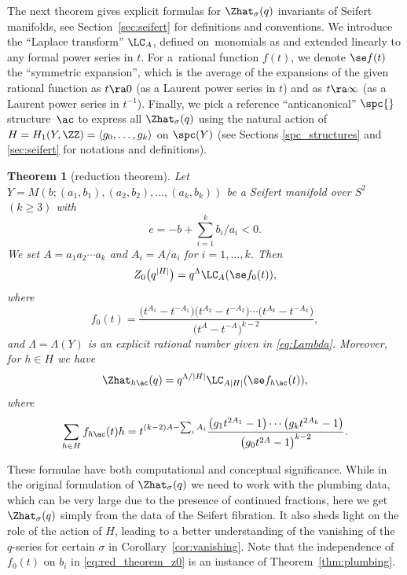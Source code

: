 \documentclass[pdftex]{sigma}
\newtheorem{Theorem}{Theorem}[section]
\begin{document}
The next theorem gives explicit formulas for $\Zhat_\sigma(q)$ invariants of Seifert manifolds, see Section~\ref{sec:seifert} for definitions and conventions. We introduce the ``Laplace transform'' $\LC_A$, defined on~monomials as
and extended linearly to any formal power series in $t$. For a~rational function $f(t)$, we denote $\se f(t)$ the ``symmetric expansion'', which is the average of the expansions of the given rational function as $t \ra 0$ (as a Laurent power series in $t$) and as $t \ra \infty$ \big(as a Laurent power series in $t^{-1}$\big). Finally, we pick a reference ``anticanonical'' $\spc{}$ structure~$\ac$ to express all $\Zhat_\sigma(q)$ using the natural action of $H = H_1(Y,\ZZ) = \langle g_0,\dots, g_k \rangle$ on $\spc(Y)$ (see Sections \ref{spc_structures} and \ref{sec:seifert} for notations and definitions).

\begin{Theorem}[reduction theorem]
	Let $Y = M(b;(a_1, b_1), (a_2, b_2), \dots, (a_k, b_k))$ be a Seifert manifold over $S^2$ $(k \geq 3)$ with
\[
e=-b+\sum_{i=1}^k b_i/a_i<0.
\]
 We set $A=a_1 a_2\cdots a_k$ and $A_i=A/a_i$ for $i=1,\dots, k$. Then
	\begin{gather}\label{eq:red_theorem_z0}
		Z_0\bigl(q^{|H|}\bigr) = q^\Lambda \LC_A(\se f_0(t)),
	\end{gather}
	where
	\[
		f_0(t) = \frac{\bigl(t^{A_1}-t^{-A_1}\bigr)\bigl(t^{A_2}-t^{-A_2}\bigr)\cdots\bigl(t^{A_k}-t^{-A_k}\bigr)}{\bigl(t^A-t^{-A}\bigr)^{k-2}},
	\]
 and $\Lambda = \Lambda(Y)$ is an explicit rational number given in \eqref{eq:Lambda}.
	Moreover, for $h \in H$ we have
	\[
		\Zhat_{h \ac}(q) = q^{\Lambda/|H|} \LC_{A|H|}(\se f_{h \ac}(t)),
	\]
	where
	\[
		\sum_{h \in H} f_{h \ac}(t)h = t^{(k-2)A - \sum_i A_i}\frac{\bigl(g_1 t^{2A_1}-1\bigr)\cdots\bigl(g_k t^{2A_k}-1\bigr)}{\bigl(g_0 t^{2A}-1\bigr)^{k-2}}.
	\]
\end{Theorem}

These formulae have both computational and conceptual significance. While in the original formulation of $\Zhat_{\sigma}(q)$ we need to work with the plumbing data, which can be very large due to the presence of continued fractions, here we get $\Zhat_{\sigma}(q)$ simply from the data of the Seifert fibration. It also sheds light on the role of the action of $H$, leading to a better understanding of the vanishing of the $q$-series for certain $\sigma$ in Corollary~\ref{cor:vanishing}. Note that the independence of $f_0(t)$ on $b_i$ in \eqref{eq:red_theorem_z0} is an instance of Theorem~\ref{thm:plumbing}.
\end{document}
